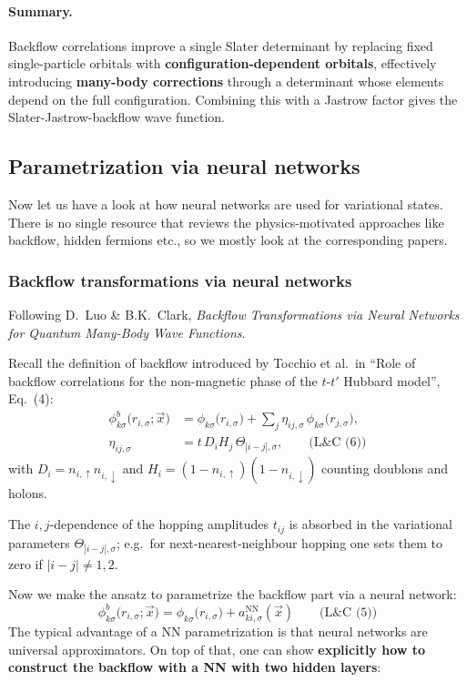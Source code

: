 \documentclass[../../main.tex]{subfiles}
\begin{document}
\paragraph{Summary.}
Backflow correlations improve a single Slater determinant by replacing fixed
single-particle orbitals with \textbf{configuration-dependent orbitals},
effectively introducing \textbf{many-body corrections} through a determinant whose
elements depend on the full configuration. Combining this with a Jastrow factor
gives the Slater-Jastrow-backflow wave function.

\subsection{Parametrization via neural networks}

Now let us have a look at how neural networks are used for variational states.
There is no single resource that reviews the physics-motivated approaches like
backflow, hidden fermions etc., so we mostly look at the corresponding papers.

\subsubsection{Backflow transformations via neural networks}

Following D.\ Luo \& B.K.\ Clark, \emph{Backflow Transformations via Neural
Networks for Quantum Many-Body Wave Functions}.

Recall the definition of backflow introduced by Tocchio et al.\ in ``Role of
backflow correlations for the non-magnetic phase of the $t$-$t'$ Hubbard model'',
Eq.~(4):
\begin{align}
\phi^b_{k\sigma}\big(r_{i,\sigma};\vec x\big)
&=\phi_{k\sigma}\big(r_{i,\sigma}\big)+\sum_j \eta_{ij,\sigma}\,
\phi_{k\sigma}\big(r_{j,\sigma}\big),\\
\eta_{ij,\sigma}&=t\,D_i H_j\,\Theta_{|i-j|,\sigma}, \qquad \text{(L\&C (6))}
\end{align}
with $D_i=n_{i,\uparrow}n_{i,\downarrow}$ and
$H_i=(1-n_{i,\uparrow})(1-n_{i,\downarrow})$ counting doublons and holons.

The $i,j$-dependence of the hopping amplitudes $t_{ij}$ is absorbed in the
variational parameters $\Theta_{|i-j|,\sigma}$; e.g.\ for next-nearest-neighbour
hopping one sets them to zero if $|i-j|\neq 1,2$.

Now we make the ansatz to parametrize the backflow part via a neural network:
\begin{equation}
\phi^b_{k\sigma}\big(r_{i,\sigma};\vec x\big)
=\phi_{k\sigma}\big(r_{i,\sigma}\big)+a^{\mathrm{NN}}_{k i,\sigma}(\vec x) \qquad \text{(L\&C (5))}
\end{equation}
The typical advantage of a NN parametrization is that neural networks are
universal approximators. On top of that, one can show \textbf{explicitly how to
construct the backflow with a NN with two hidden layers}:
\end{document}
